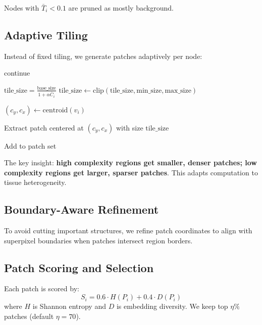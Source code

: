 \documentclass[runningheads]{llncs}
\begin{document}
Nodes with $\bar{T}_i < 0.1$ are pruned as mostly background.

\subsection{Adaptive Tiling}

\label{sec:adaptive}

Instead of fixed tiling, we generate patches adaptively per node:

\begin{algorithm}
\caption{Adaptive Tiling}
\begin{algorithmic}
    \State continue
  \EndIf
  
  \State $\text{tile\_size} = \frac{\text{base\_size}}{1 + \alpha \bar{C}_i}$
  \State $\text{tile\_size} \leftarrow \text{clip}(\text{tile\_size}, \text{min\_size}, \text{max\_size})$
  
  \State $(c_y, c_x) \leftarrow \text{centroid}(v_i)$
  
  \State Extract patch centered at $(c_y, c_x)$ with size $\text{tile\_size}$
  
    \State Add to patch set
  \EndIf
\EndFor
\end{algorithmic}
\end{algorithm}

The key insight: \textbf{high complexity regions get smaller, denser patches; low complexity regions get larger, sparser patches}. This adapts computation to tissue heterogeneity.

\subsection{Boundary-Aware Refinement}

\label{sec:boundary}

To avoid cutting important structures, we refine patch coordinates to align with superpixel boundaries when patches intersect region borders.

\subsection{Patch Scoring and Selection}

\label{sec:scoring}

Each patch is scored by:
\begin{equation}
S_i = 0.6 \cdot H(P_i) + 0.4 \cdot D(P_i)
\end{equation}
where $H$ is Shannon entropy and $D$ is embedding diversity. We keep top $\eta \%$ patches (default $\eta = 70$).
\end{document}
